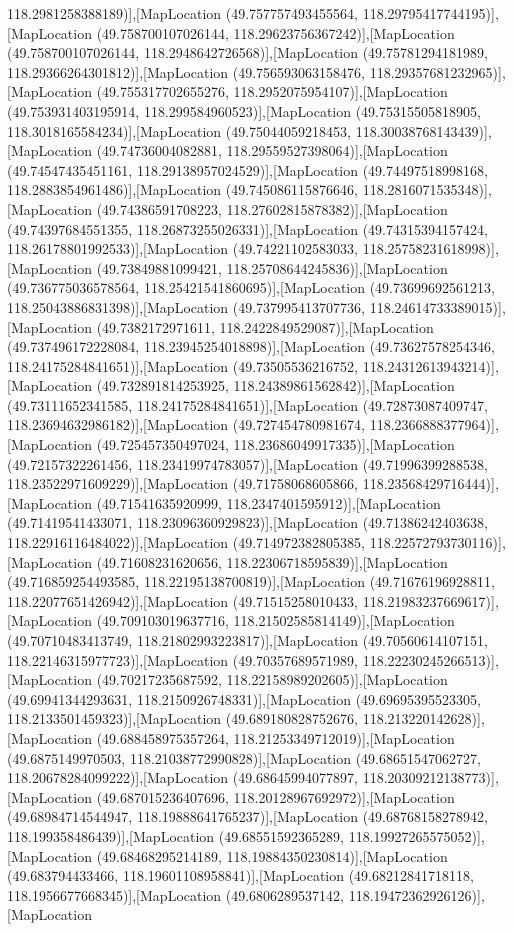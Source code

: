 118.2981258388189)],[MapLocation (49.757757493455564, 118.29795417744195)],[MapLocation (49.758700107026144, 118.29623756367242)],[MapLocation (49.758700107026144, 118.2948642726568)],[MapLocation (49.75781294181989, 118.29366264301812)],[MapLocation (49.756593063158476, 118.29357681232965)],[MapLocation (49.755317702655276, 118.2952075954107)],[MapLocation (49.753931403195914, 118.299584960523)],[MapLocation (49.75315505818905, 118.3018165584234)],[MapLocation (49.75044059218453, 118.30038768143439)],[MapLocation (49.74736004082881, 118.29559527398064)],[MapLocation (49.74547435451161, 118.29138957024529)],[MapLocation (49.74497518998168, 118.2883854961486)],[MapLocation (49.745086115876646, 118.2816071535348)],[MapLocation (49.74386591708223, 118.27602815878382)],[MapLocation (49.74397684551355, 118.26873255026331)],[MapLocation (49.74315394157424, 118.26178801992533)],[MapLocation (49.74221102583033, 118.25758231618998)],[MapLocation (49.73849881099421, 118.25708644245836)],[MapLocation (49.736775036578564, 118.25421541860695)],[MapLocation (49.73699692561213, 118.25043886831398)],[MapLocation (49.737995413707736, 118.24614733389015)],[MapLocation (49.7382172971611, 118.2422849529087)],[MapLocation (49.737496172228084, 118.23945254018898)],[MapLocation (49.73627578254346, 118.24175284841651)],[MapLocation (49.73505536216752, 118.24312613943214)],[MapLocation (49.732891814253925, 118.24389861562842)],[MapLocation (49.73111652341585, 118.24175284841651)],[MapLocation (49.72873087409747, 118.23694632986182)],[MapLocation (49.727454780981674, 118.2366888377964)],[MapLocation (49.725457350497024, 118.23686049917335)],[MapLocation (49.72157322261456, 118.23419974783057)],[MapLocation (49.71996399288538, 118.23522971609229)],[MapLocation (49.71758068605866, 118.23568429716444)],[MapLocation (49.71541635920999, 118.2347401595912)],[MapLocation (49.71419541433071, 118.23096360929823)],[MapLocation (49.71386242403638, 118.22916116484022)],[MapLocation (49.714972382805385, 118.22572793730116)],[MapLocation (49.71608231620656, 118.22306718595839)],[MapLocation (49.716859254493585, 118.22195138700819)],[MapLocation (49.71676196928811, 118.22077651426942)],[MapLocation (49.71515258010433, 118.21983237669617)],[MapLocation (49.709103019637716, 118.21502585814149)],[MapLocation (49.70710483413749, 118.21802993223817)],[MapLocation (49.70560614107151, 118.22146315977723)],[MapLocation (49.70357689571989, 118.22230245266513)],[MapLocation (49.70217235687592, 118.22158989202605)],[MapLocation (49.69941344293631, 118.2150926748331)],[MapLocation (49.69695395523305, 118.2133501459323)],[MapLocation (49.689180828752676, 118.213220142628)],[MapLocation (49.688458975357264, 118.21253349712019)],[MapLocation (49.6875149970503, 118.21038772990828)],[MapLocation (49.68651547062727, 118.20678284099222)],[MapLocation (49.68645994077897, 118.20309212138773)],[MapLocation (49.687015236407696, 118.20128967692972)],[MapLocation (49.68984714544947, 118.19888641765237)],[MapLocation (49.68768158278942, 118.199358486439)],[MapLocation (49.68551592365289, 118.19927265575052)],[MapLocation (49.68468295214189, 118.19884350230814)],[MapLocation (49.683794433466, 118.19601108958841)],[MapLocation (49.68212841718118, 118.1956677668345)],[MapLocation (49.6806289537142, 118.19472362926126)],[MapLocation 